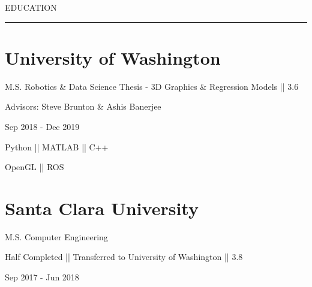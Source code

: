 

\vspace{-1.4ex}
{ \hspace{-1.72in}\noindent\color{cblue} {EDUCATION} }

\vspace{-1.6ex}
{\hspace{-1.73in}\noindent\color{dblue}\rule{6.935in}{0.4pt}} %

\vspace{-0.4ex}
\section{\textbf{University of Washington}}{}

{\small M.S. Robotics \& Data Science}
\BulletItem
{\small Thesis - 3D Graphics \& Regression Models || 3.6}

\vspace{0.2ex}
{
\vspace{-0.5ex}
\BulletItem
\small
{Advisors: Steve Brunton \& Ashis Banerjee} %
}



\begin{subtitle}
\vspace{-8ex}
{{Sep 2018 - Dec 2019}}
\end{subtitle}

\vspace{-1ex}

{
\vspace{1.4ex}
\color{cyan}\small
{Python || MATLAB || C++} %
}

{
\vspace{-2.5ex}\hspace{3.17in}
\color{cyan}\small
{OpenGL || ROS} %
}


\section
{\textbf{Santa Clara University}}{}{}

{{\small M.S. Computer Engineering }}
\begin{detail}
\BulletItem
Half Completed || Transferred to University of Washington || 3.8
\end{detail}

\begin{subtitle}
\vspace{-8ex}
{{Sep 2017 - Jun 2018}}
\end{subtitle}

